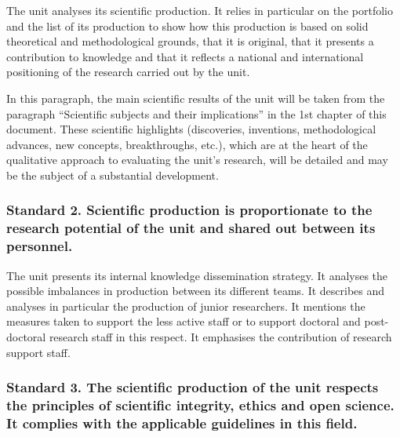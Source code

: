 \begin{hceresinstructions}
  The unit analyses its scientific production. It relies in particular on
  the portfolio and the list of its production to show how this production
  is based on solid theoretical and methodological grounds, that it is
  original, that it presents a contribution to knowledge and that it
  reflects a national and international positioning of the research
  carried out by the unit.

  In this paragraph, the main scientific results of the unit will be taken
  from the paragraph ``Scientific subjects and their implications'' in the
  1st chapter of this document. These scientific highlights (discoveries,
  inventions, methodological advances, new concepts, breakthroughs, etc.),
  which are at the heart of the qualitative approach to evaluating the
  unit's research, will be detailed and may be the subject
  of a substantial development.
\end{hceresinstructions}

\subsubsection*{Standard 2. Scientific production is proportionate to the research
potential of the unit and shared out between its personnel.}

\begin{hceresinstructions}
  The unit presents its internal knowledge dissemination strategy. It
  analyses the possible imbalances in production between its different
  teams. It describes and analyses in particular the production of junior
  researchers. It mentions the measures taken to support the less active
  staff or to support doctoral and post-doctoral research staff in this
  respect. It emphasises the contribution of research support staff.
\end{hceresinstructions}

\subsubsection*{Standard 3. The scientific production of the unit respects the
principles of scientific integrity, ethics and open science. It complies
with the applicable guidelines in this field.}


